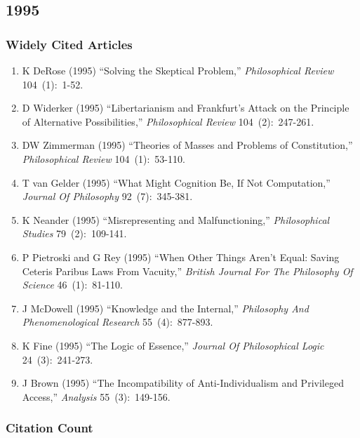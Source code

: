 \documentclass[
  10pt,
  letterpaper,
  DIV=11,
  numbers=noendperiod,
  twoside]{scrartcl}
\providecommand{\tightlist}{%
  \setlength{\itemsep}{0pt}\setlength{\parskip}{0pt}}\usepackage{longtable,booktabs,array}
\begin{document}
\newpage

\subsection{1995}\label{sec-s1995}

\subsubsection*{Widely Cited Articles}\label{widely-cited-articles-38}

\begin{enumerate}
\def\labelenumi{\arabic{enumi}.}
\tightlist
\item
  K DeRose (1995) ``Solving the Skeptical Problem,'' \emph{Philosophical
  Review} 104~(1):~1-52.
\item
  D Widerker (1995) ``Libertarianism and Frankfurt's Attack on the
  Principle of Alternative Possibilities,'' \emph{Philosophical Review}
  104~(2):~247-261.
\item
  DW Zimmerman (1995) ``Theories of Masses and Problems of
  Constitution,'' \emph{Philosophical Review} 104~(1):~53-110.
\item
  T van Gelder (1995) ``What Might Cognition Be, If Not Computation,''
  \emph{Journal Of Philosophy} 92~(7):~345-381.
\item
  K Neander (1995) ``Misrepresenting and Malfunctioning,''
  \emph{Philosophical Studies} 79~(2):~109-141.
\item
  P Pietroski and G Rey (1995) ``When Other Things Aren't Equal: Saving
  Ceteris Paribus Laws From Vacuity,'' \emph{British Journal For The
  Philosophy Of Science} 46~(1):~81-110.
\item
  J McDowell (1995) ``Knowledge and the Internal,'' \emph{Philosophy And
  Phenomenological Research} 55~(4):~877-893.
\item
  K Fine (1995) ``The Logic of Essence,'' \emph{Journal Of Philosophical
  Logic} 24~(3):~241-273.
\item
  J Brown (1995) ``The Incompatibility of Anti-Individualism and
  Privileged Access,'' \emph{Analysis} 55~(3):~149-156.
\end{enumerate}

\subsubsection*{Citation Count}\label{sec-count-1995}
\end{document}
